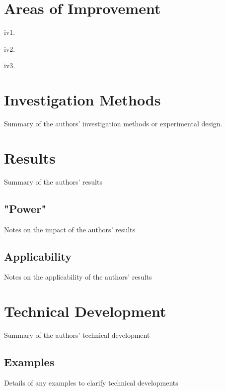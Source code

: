 \documentclass[12pt]{article}
\begin{document}
\section{Areas of Improvement}
\label{improvement}


\begin{itemize}
\begin{item}
iv1. 
\end{item}
\begin{item}
iv2. 

\end{item}
\begin{item}
iv3. 

\end{item}

\end{itemize} 

\section{Investigation Methods}\label{invest}
Summary of the authors' investigation methods or experimental design.

\section{Results}\label{results}
Summary of the authors' results

\subsection{"Power"}\label{results-power}
Notes on the impact of the authors' results

\subsection{Applicability}\label{results-apply}
Notes on the applicability of the authors' results

\section{Technical Development}\label{tech}
Summary of the authors' technical development

\subsection{Examples}\label{tech-examples}
Details of any examples to clarify technical developments



\end{document}
